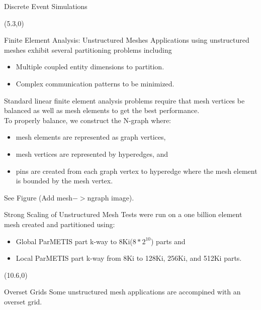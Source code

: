 \documentclass{beamer}
\begin{document}
\begin{textblock}{15.6}
\begin{textblock}{5}
\begin{block}{Discrete Event Simulations}
          \end{block}
        \end{textblock}
        \begin{textblock}{5}(5.3,0)
          \begin{block}{Finite Element Analysis: Unstructured Meshes}
            Applications using unstructured meshes exhibit several partitioning problems including
            \begin{itemize}
            \item Multiple coupled entity dimensions to partition.
            \item Complex communication patterns to be minimized.
            \end{itemize}
            Standard linear finite element analysis problems require that mesh vertices be balanced as well as mesh elements to get the best performance.\\
            To properly balance, we construct the N-graph where:
            \begin{itemize}
              \item mesh elements are represented as graph vertices,
              \item mesh vertices are represented by hyperedges, and
              \item pins are created from each graph vertex to hyperedge where the mesh element is bounded by the mesh vertex.
            \end{itemize}
            See Figure (Add mesh$->$ngraph image).

          \end{block}
          \begin{block}{Strong Scaling of Unstructured Mesh}
            Tests were run on a one billion element mesh created and partitioned using:
            \begin{itemize}
            \item Global ParMETIS part k-way to 8Ki($8*2^{10}$) parts and
            \item Local ParMETIS part k-way from 8Ki to 128Ki, 256Ki, and 512Ki parts.
            \end{itemize}

          \end{block}
        \end{textblock}
        \begin{textblock}{5}(10.6,0)
          \begin{block}{Overset Grids}
            Some unstructured mesh applications are accompined with an overset grid.


\end{block}
\end{textblock}
\end{textblock}
\end{document}
